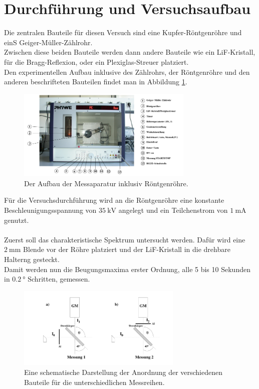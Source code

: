\section{Durchführung und Versuchsaufbau}


\noindent Die zentralen Bauteile für diesen Versuch sind eine Kupfer-Röntgenröhre und einS Geiger-Müller-Zählrohr.\\
Zwischen diese beiden Bauteile werden dann andere Bauteile wie ein LiF-Kristall, für die Bragg-Reflexion, oder ein Plexiglas-Streuer platziert.\\
Den experimentellen Aufbau inklusive des Zählrohrs, der Röntgenröhre und den anderen beschrifteten Bauteilen findet man in Abbildung \ref{img:aufbau}.



\begin{figure}[h]
    \centering
    \includegraphics[width=0.75\textwidth]{latex/images/roentgenroehre.PNG}
    \caption{Der Aufbau der Messaparatur inklusiv Röntgenröhre\protect \cite{V603}.}
    \label{img:aufbau}
\end{figure}

\noindent
Für die Versuchsdurchführung wird an die Röntgenröhre eine konstante Beschleunigungsspannung von $\SI{35}{\kilo\volt}$ angelegt und ein Teilchenstrom von $\SI{1}{\milli\ampere}$ genutzt.\\\\
Zuerst soll das charakteristische Spektrum untersucht werden. Dafür wird eine $\SI{2}{\milli\metre}$ Blende vor der Röhre platziert und der LiF-Kristall in die drehbare Halterng gesteckt.\\
Damit werden nun die Beugungsmaxima erster Ordnung, alle 5 bis 10 Sekunden in $\SI{0.2}{\degree}$ Schritten, gemessen.\\



\begin{figure}[h]
    \centering
    \includegraphics[width=0.70\textwidth]{latex/images/aufbau.PNG}
    \caption{Eine schematische Darstellung der Anordnung der verschiedenen Bauteile für die unterschiedlichen Messreihen\protect \cite{V603}.}
    \label{img:aufbau2}
\end{figure}

